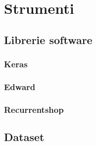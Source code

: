 \chapter{Strumenti}
\section{Librerie software}
\subsection{Keras}
\subsection{Edward}
\subsection{Recurrentshop}
\section{Dataset}